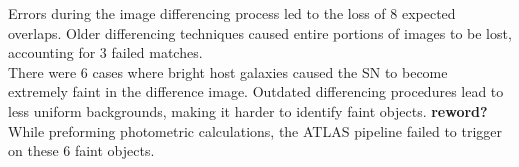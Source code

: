 \documentclass[aps,prb,twocolumn,superscriptaddress]{revtex4-1}
\begin{document}
\indent Errors during the image differencing process led to the loss of 8 
expected overlaps. Older differencing techniques caused entire portions 
of images to be lost, accounting for 3 failed matches.\\

\indent There were 6 cases where bright host galaxies caused the SN to become extremely 
faint in the difference image. Outdated differencing procedures lead to less 
uniform backgrounds, making it harder to identify faint objects. {\bf reword?} 
While preforming photometric calculations, the ATLAS pipeline failed to trigger 
on these 6 faint objects.
\end{document}
